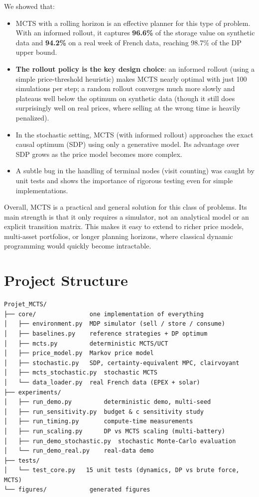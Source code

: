 \documentclass[12pt,a4paper]{article}
\begin{document}
We showed that:
\begin{itemize}
  \item MCTS with a rolling horizon is an effective planner for this type of
    problem. With an informed rollout, it captures \textbf{96.6\%} of the
    storage value on synthetic data and \textbf{94.2\%} on a real week of
    French data, reaching 98.7\% of the DP upper bound.
  \item \textbf{The rollout policy is the key design choice}: an informed
    rollout (using a simple price-threshold heuristic) makes MCTS nearly
    optimal with just 100 simulations per step; a random rollout converges
    much more slowly and plateaus well below the optimum on synthetic data
    (though it still does surprisingly well on real prices, where selling at
    the wrong time is heavily penalized).
  \item In the stochastic setting, MCTS (with informed rollout) approaches
    the exact causal optimum (SDP) using only a generative model. Its
    advantage over SDP grows as the price model becomes more complex.
  \item A subtle bug in the handling of terminal nodes (visit counting) was
    caught by unit tests and shows the importance of rigorous testing even
    for simple implementations.
\end{itemize}

Overall, MCTS is a practical and general solution for this class of problems.
Its main strength is that it only requires a simulator, not an analytical
model or an explicit transition matrix. This makes it easy to extend to richer
price models, multi-asset portfolios, or longer planning horizons, where
classical dynamic programming would quickly become intractable.

\appendix
\section{Project Structure}

\begin{verbatim}
Projet_MCTS/
├── core/               one implementation of everything
│   ├── environment.py  MDP simulator (sell / store / consume)
│   ├── baselines.py    reference strategies + DP optimum
│   ├── mcts.py         deterministic MCTS/UCT
│   ├── price_model.py  Markov price model
│   ├── stochastic.py   SDP, certainty-equivalent MPC, clairvoyant
│   ├── mcts_stochastic.py  stochastic MCTS
│   └── data_loader.py  real French data (EPEX + solar)
├── experiments/
│   ├── run_demo.py         deterministic demo, multi-seed
│   ├── run_sensitivity.py  budget & c sensitivity study
│   ├── run_timing.py       compute-time measurements
│   ├── run_scaling.py      DP vs MCTS scaling (multi-battery)
│   ├── run_demo_stochastic.py  stochastic Monte-Carlo evaluation
│   └── run_demo_real.py    real-data demo
├── tests/
│   └── test_core.py   15 unit tests (dynamics, DP vs brute force, MCTS)
└── figures/            generated figures
\end{verbatim}
\end{document}
